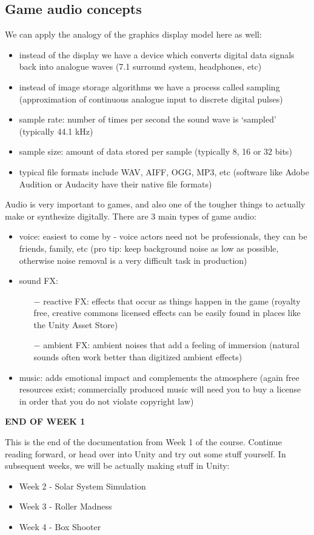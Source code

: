 \documentclass{article}[a4paper,12pt]
\theoremstyle{definition}
\begin{document}
\subsection{Game audio concepts}
We can apply the analogy of the graphics display model here as well:
\begin{itemize}
	\item instead of the display we have a device which converts digital data signals back into analogue waves (7.1 surround system, headphones, etc)
	\item instead of image storage algorithms we have a process called sampling (approximation of continuous analogue input to discrete digital pulses)
	\item sample rate: number of times per second the sound wave is `sampled' (typically 44.1 kHz)
	\item sample size: amount of data stored per sample (typically 8, 16 or 32 bits)
	\item typical file formats include WAV, AIFF, OGG, MP3, etc (software like Adobe Audition or Audacity have their native file formats)
\end{itemize}
Audio is very important to games, and also one of the tougher things to actually make or synthesize digitally. There are 3 main types of game audio:
\begin{itemize}
	\item voice: easiest to come by - voice actors need not be professionals, they can be friends, family, etc (pro tip: keep background noise as low as possible, otherwise noise removal is a very difficult task in production)
	\item sound FX:
	\begin{itemize}
		\item[$-$] reactive FX: effects that occur as things happen in the game (royalty free, creative commons licensed effects can be easily found in places like the Unity Asset Store)
		\item[$-$] ambient FX: ambient noises that add a feeling of immersion (natural sounds often work better than digitized ambient effects)
	\end{itemize}
	\item music: adds emotional impact and complements the atmosphere (again free resources exist; commercially produced music will need you to buy a license in order that you do not violate copyright law)
\end{itemize}
\hrulefill
\begin{center}\textbf{END OF WEEK 1}\end{center}
This is the end of the documentation from Week 1 of the course. Continue reading forward, or head over into Unity and try out some stuff yourself. In subsequent weeks, we will be actually making stuff in Unity:
\begin{itemize}
	\item Week 2 - Solar System Simulation
	\item Week 3 - Roller Madness
	\item Week 4 - Box Shooter
\end{itemize}
\end{document}
